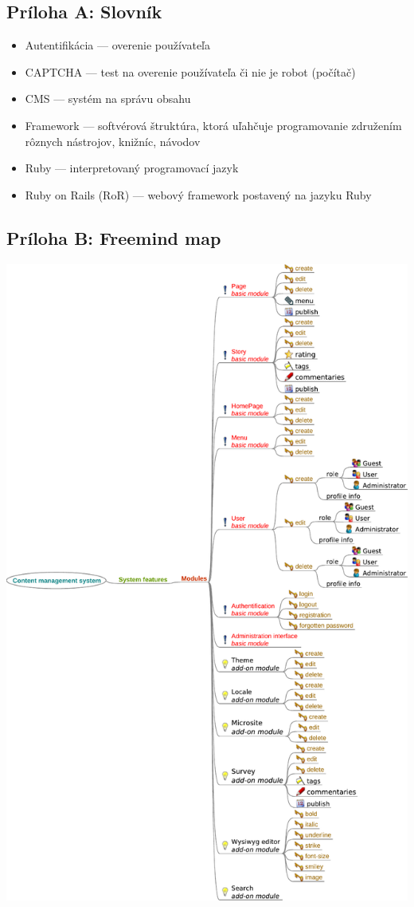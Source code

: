 \documentclass[a4paper,titlepage,11pt]{article}
\begin{document}
\subsection*{Príloha A: Slovník}
\begin{itemize}
 \item Autentifikácia --- overenie používateľa
 \item CAPTCHA --- test na overenie používateľa či nie je robot (počítač)
 \item CMS --- systém na správu obsahu
 \item Framework --- softvérová štruktúra, ktorá uľahčuje programovanie združením rôznych nástrojov, knižníc, návodov 
 \item Ruby --- interpretovaný programovací jazyk
 \item Ruby on Rails (RoR) --- webový framework postavený na jazyku Ruby
\end{itemize}

\subsection*{Príloha B: Freemind map}
\includegraphics[width=\textwidth]{freemind.pdf}
\end{document}
